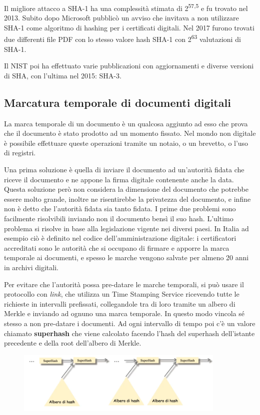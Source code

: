 Il migliore attacco a SHA-1 ha una complessità stimata di 2\textsuperscript{57,5} e fu trovato nel 2013. Subito dopo Microsoft pubblicò un avviso che invitava a non utilizzare SHA-1 come algoritmo di hashing per i certificati digitali. Nel 2017 furono trovati due differenti file PDF con lo stesso valore hash SHA-1 con 2\textsuperscript{63} valutazioni di SHA-1.

Il NIST poi ha effettuato varie pubblicazioni con aggiornamenti e diverse versioni di SHA, con l'ultima nel 2015: SHA-3. 

\subsection{Marcatura temporale di documenti digitali}
La marca temporale di un documento è un qualcosa aggiunto ad esso che prova che il documento è stato prodotto ad un momento fissato. Nel mondo non digitale è possibile effettuare queste operazioni tramite un notaio, o un brevetto, o l'uso di registri. 

Una prima soluzione è quella di inviare il documento ad un'autorità fidata che riceve il documento e ne appone la firma digitale contenente anche la data. Questa soluzione però non considera la dimensione del documento che potrebbe essere molto grande, inoltre ne risentirebbe la privatezza del documento, e infine non è detto che l'autorità fidata sia tanto fidata. I prime due problemi sono facilmente risolvibili inviando non il documento bensì il suo hash. L'ultimo problema si risolve in base alla legislazione vigente nei diversi paesi. In Italia ad esempio ciò è definito nel codice dell'amministrazione digitale: i certificatori accreditati sono le autorità che si occupano di firmare e apporre la marca temporale ai documenti, e spesso le marche vengono salvate per almeno 20 anni in archivi digitali.

Per evitare che l'autorità possa pre-datare le marche temporali, si può usare il protocollo con \textit{link}, che utilizza un Time Stamping Service ricevendo tutte le richieste in intervalli prefissati, collegandole tra di loro tramite un albero di Merkle e inviando ad ognuno una marca temporale. In questo modo vincola sé stesso a non pre-datare i documenti. Ad ogni intervallo di tempo poi c'è un valore chiamato \textbf{superhash} che viene calcolato facendo l'hash del superhash dell'istante precedente e della root dell'albero di Merkle. 

\begin{figure}[htb!]
    \centering
    \includegraphics[width=10cm]{./Images/cap1/1.55.png}
\end{figure} 


